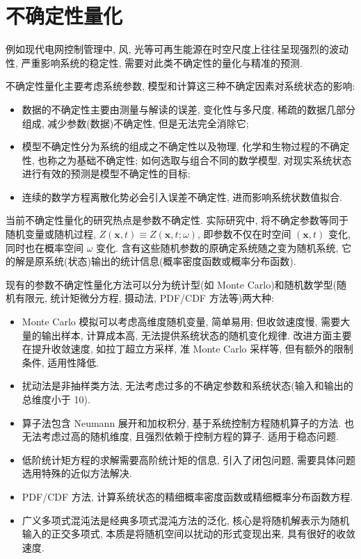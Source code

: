 \section{不确定性量化}

例如现代电网控制管理中, 风, 光等可再生能源在时空尺度上往往呈现强烈的波动性, 严重影响系统的稳定性, 需要对此类不确定性的量化与精准的预测.

不确定性量化主要考虑系统参数, 模型和计算这三种不确定因素对系统状态的影响:
\begin{itemize}
  \item 数据的不确定性主要由测量与解读的误差, 变化性与多尺度, 稀疏的数据几部分组成, 减少参数(数据)不确定性, 但是无法完全消除它;
  \item 模型不确定性分为系统的组成之不确定性以及物理, 化学和生物过程的不确定性, 也称之为基础不确定性; 如何选取与组合不同的数学模型, 对现实系统状态进行有效的预测是模型不确定性的目标;
  \item 连续的数学方程离散化势必会引入误差不确定性, 进而影响系统状数值拟合.
\end{itemize}

当前不确定性量化的研究热点是参数不确定性. 实际研究中, 将不确定参数等同于随机变量或随机过程, \(Z(\boldsymbol{x},t)\equiv Z(\boldsymbol{x},t;\omega)\), 即参数不仅在时空间 \((\boldsymbol{x},t)\) 变化, 同时也在概率空间 \(\omega\) 变化. 含有这些随机参数的原确定系统随之变为随机系统, 它的解是原系统(状态)输出的统计信息(概率密度函数或概率分布函数).

现有的参数不确定性量化方法可以分为统计型(如 Monte Carlo)和随机数学型(随机有限元, 统计矩微分方程, 摄动法, PDF/CDF 方法等)两大种:
\begin{itemize}
  \item Monte Carlo 模拟可以考虑高维度随机变量, 简单易用; 但收敛速度慢, 需要大量的输出样本, 计算成本高, 无法提供系统状态的随机变化规律. 改进方面主要在提升收敛速度, 如拉丁超立方采样, 准 Monte Carlo 采样等, 但有额外的限制条件, 适用性降低.
  \item 扰动法是非抽样类方法, 无法考虑过多的不确定参数和系统状态(输入和输出的总维度小于 10).
  \item 算子法包含 Neumann 展开和加权积分, 基于系统控制方程随机算子的方法. 也无法考虑过高的随机维度, 且强烈依赖于控制方程的算子. 适用于稳态问题.
  \item 低阶统计矩方程的求解需要高阶统计矩的信息, 引入了闭包问题, 需要具体问题选用特殊的近似方法解决.
  \item PDF/CDF 方法, 计算系统状态的精细概率密度函数或精细概率分布函数方程.
  \item 广义多项式混沌法是经典多项式混沌方法的泛化, 核心是将随机解表示为随机输入的正交多项式, 本质是将随机空间以扰动的形式变现出来, 具有很好的收敛速度.
\end{itemize}


